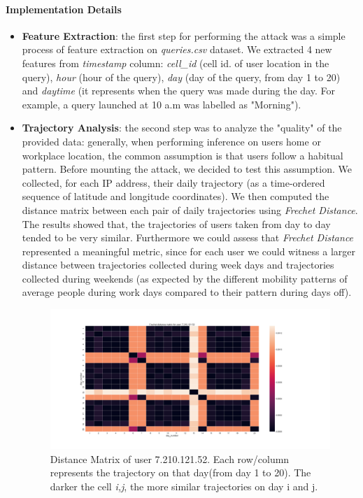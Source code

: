 \documentclass[10pt,conference,compsocconf]{IEEEtran}
\begin{document}
\paragraph{Implementation Details}
\begin{itemize}
    \item \textbf{Feature Extraction}: the first step for performing the attack
    was a simple process of feature extraction on     \textit{queries.csv} dataset. We extracted 4 new features from \textit{timestamp} column:
    \textit{cell\_id} (cell id. of user location in the query), \textit{hour} (hour of the query),
    \textit{day} (day of the query, from day 1 to 20) and \textit{daytime}
    (it represents when the query was made during the day. For example, a query launched
    at 10 a.m was labelled as "Morning").

    \item \textbf{Trajectory Analysis}: the second step was to
    analyze the "quality" of the provided data: generally, when performing
    inference on users home or workplace location, the common assumption is that
    users follow a habitual pattern. Before
    mounting the attack, we decided to test this assumption. We collected, for
    each IP address, their daily trajectory (as a time-ordered sequence of
    latitude and longitude coordinates). We then computed the distance matrix
    between each pair of daily trajectories using \textit{Frechet Distance}. The
    results showed that, the trajectories of users taken from day to day tended to be very similar.
    Furthermore we could assess that \textit{Frechet Distance} represented a
    meaningful metric, since for each user we could witness a larger distance
    between trajectories collected during week days and trajectories collected
    during weekends (as expected by the different mobility patterns of average people
    during work days compared to their pattern during days off).


    \begin{figure}[h!]
        \centering
        \includegraphics[width=0.6\linewidth]{7.210.121.52-matrix.png}
        \caption{Distance Matrix of user 7.210.121.52. Each row/column represents the trajectory on that day(from day 1 to 20). The darker the cell \textit{i,j}, the more similar trajectories on day i and j.}
        \label{fig:matrix}
    \end{figure}



\end{itemize}
\end{document}

